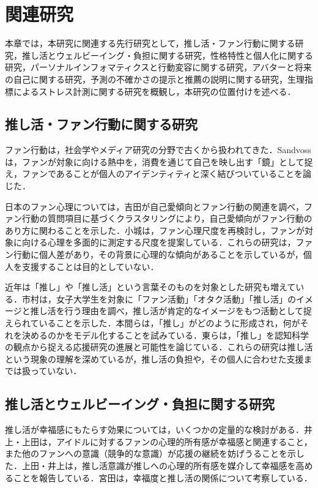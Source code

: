 \chapter{関連研究}
本章では，本研究に関連する先行研究として，推し活・ファン行動に関する研究，推し活とウェルビーイング・負担に関する研究，性格特性と個人化に関する研究，パーソナルインフォマティクスと行動変容に関する研究，アバターと将来の自己に関する研究，予測の不確かさの提示と推薦の説明に関する研究，生理指標によるストレス計測に関する研究を概観し，本研究の位置付けを述べる．

\section{推し活・ファン行動に関する研究}
ファン行動は，社会学やメディア研究の分野で古くから扱われてきた．Sandvoss\cite{sandvoss2005}は，ファンが対象に向ける熱中を，消費を通じて自己を映し出す「鏡」として捉え，ファンであることが個人のアイデンティティと深く結びついていることを論じた．

日本のファン心理については，吉田\cite{yoshida2010}が自己愛傾向とファン行動の関連を調べ，ファン行動の質問項目に基づくクラスタリングにより，自己愛傾向がファン行動のあり方に関わることを示した．小城\cite{koshiro2018}は，ファン心理尺度を再検討し，ファンが対象に向ける心理を多面的に測定する尺度を提案している．これらの研究は，ファン行動に個人差があり，その背景に心理的な傾向があることを示しているが，個人を支援することは目的としていない．

近年は「推し」や「推し活」という言葉そのものを対象とした研究も増えている．市村\cite{ichimura2025}は，女子大学生を対象に「ファン活動」「オタク活動」「推し活」のイメージと推し活を行う理由を調べ，推し活が肯定的なイメージをもつ活動として捉えられていることを示した．本間ら\cite{homma2025}は，「推し」がどのように形成され，何がそれを決めるのかをモデル化することを試みている．東ら\cite{higashi2024}は，「推し」を認知科学の観点から捉える応援研究の進展と可能性を論じている．これらの研究は推し活という現象の理解を深めているが，推し活の負担や，その個人に合わせた支援までは扱っていない．

\section{推し活とウェルビーイング・負担に関する研究}
推し活が幸福感にもたらす効果については，いくつかの定量的な検討がある．井上・上田\cite{inoue2023}は，アイドルに対するファンの心理的所有感が幸福感と関連すること，また他のファンへの意識（競争的な意識）が応援の継続を妨げうることを示した．上田・井上\cite{ueda2023}は，推し活意識が推しへの心理的所有感を媒介して幸福感を高めることを報告している．宮田\cite{miyata2024}は，幸福度と推し活の関係について考察している．

